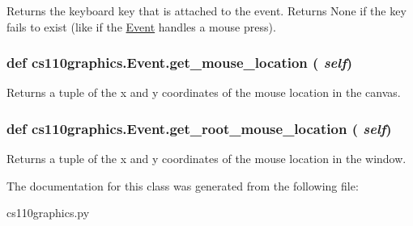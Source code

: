 Returns the keyboard key that is attached to the event. Returns None if the key fails to exist (like if the \hyperlink{classcs110graphics_1_1Event}{Event} handles a mouse press). \hypertarget{classcs110graphics_1_1Event_a2db4866adee7a6ddb8d32240801fb8ce}{
\subsubsection[{get\_\-mouse\_\-location}]{\setlength{\rightskip}{0pt plus 5cm}def cs110graphics.Event.get\_\-mouse\_\-location ( {\em self})}}
\label{classcs110graphics_1_1Event_a2db4866adee7a6ddb8d32240801fb8ce}


Returns a tuple of the x and y coordinates of the mouse location in the canvas. \hypertarget{classcs110graphics_1_1Event_a7c8fb2d5e9288db125801d5a6e66ecf1}{
\subsubsection[{get\_\-root\_\-mouse\_\-location}]{\setlength{\rightskip}{0pt plus 5cm}def cs110graphics.Event.get\_\-root\_\-mouse\_\-location ( {\em self})}}
\label{classcs110graphics_1_1Event_a7c8fb2d5e9288db125801d5a6e66ecf1}


Returns a tuple of the x and y coordinates of the mouse location in the window. 

The documentation for this class was generated from the following file:\begin{DoxyCompactItemize}
\item 
cs110graphics.py\end{DoxyCompactItemize}
